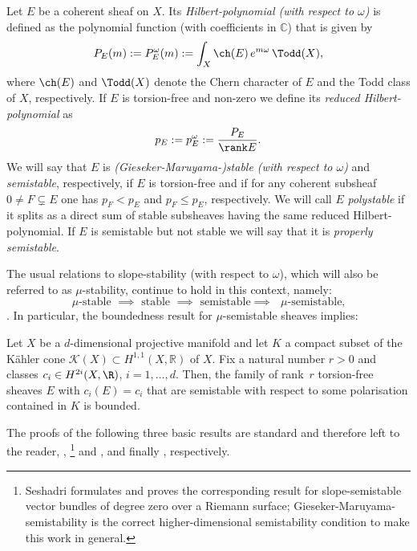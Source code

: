 \begin{Defi}
Let $E$ be a coherent sheaf on $X$. Its \emph{Hilbert-polynomial (with respect to $\omega$)} is defined as the polynomial function (with coefficients in $\mathbb{C}$) that is given by
\[
P_E(m):=P^{\omega}_E(m) := \int_X \ch(E)\, e^{m\omega}\, \Todd(X),
\]
where $\ch(E)$ and $\Todd(X)$ denote the Chern character of $E$ and the Todd class of $X$, respectively.
If $E$ is torsion-free and non-zero we define its \emph{reduced Hilbert-polynomial} as
\[
p_E:=p^{\omega}_E := \frac{P_E}{\rank E}.
\]
We will say that $E$ is \emph{(Gieseker-Maruyama-)stable (with respect to $\omega$)} and \emph{semistable}, respectively, if $E$ is torsion-free and if for any coherent subsheaf $0\neq F\subsetneq E$ one has $p_F<p_E$ and $p_F\le p_E$, respectively. We will call $E$ \emph{polystable} if it splits as a direct sum of stable subsheaves having the same reduced Hilbert-polynomial.
If $E$ is semistable but not stable we will say that it is \emph{properly semistable}.
\end{Defi}

The usual relations to slope-stability (with respect to $\omega$), which will also be referred to as $\mu$-stability, continue to hold in this context, namely:
\[
\text{$\mu$-stable $\implies$ stable $\implies $ semistable
$\implies $ $\mu$-semistable,}
\]
\cf \cite[Lem.\,1.6.4]{HL}.
In particular, the boundedness result \cite[Prop.\,6.3]{GrebToma} for $\mu$-semistable sheaves implies:

\begin{Prop}[Boundedness]\label{boundedness}
Let $X$ be a $d$-dimensional projective manifold and let $K$ a compact subset of the Kähler cone $\mathcal{K}(X) \subset H^{1,1}(X, \mathbb{R})$ of $X$. Fix a natural number $r>0$ and classes $c_i\in H^{2i}(X,\R)$, $i = 1, \dots, d$. Then, the family
of rank~$r$ torsion-free sheaves $E$ with $c_i(E)=c_i$ that are semistable with respect to some polarisation contained in $K$ is bounded.
\end{Prop}

The proofs of the following three basic results are standard and therefore left to the reader, \cf \cite[Prop.\,1.2.7]{HL}, \cite[Prop.\,3.1]{Seshadri}\footnote{Seshadri formulates and proves the corresponding result for slope-semistable vector bundles of degree zero over a Riemann surface; Gieseker-Maruyama-semistability is the correct higher-dimensional semistability condition to make this work in general.} and \cite[\S 9.3]{LePotier_Lectures}, and finally \cite[Prop.\,1.5.2]{HL}, respectively.

